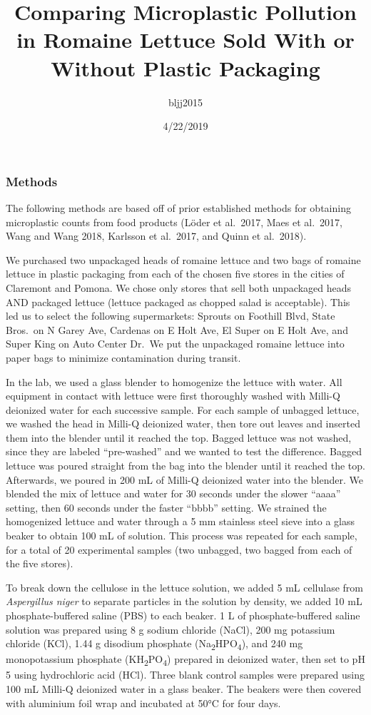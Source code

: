 \documentclass[]{article}
\title{Comparing Microplastic Pollution in Romaine Lettuce Sold With or Without
Plastic Packaging}
\author{bljj2015}
\date{4/22/2019}
\begin{document}
\maketitle

\hypertarget{methods}{%
\subsubsection{Methods}\label{methods}}

The following methods are based off of prior established methods for
obtaining microplastic counts from food products (Löder et al.~2017,
Maes et al.~2017, Wang and Wang 2018, Karlsson et al.~2017, and Quinn et
al.~2018).

We purchased two unpackaged heads of romaine lettuce and two bags of
romaine lettuce in plastic packaging from each of the chosen five stores
in the cities of Claremont and Pomona. We chose only stores that sell
both unpackaged heads AND packaged lettuce (lettuce packaged as chopped
salad is acceptable). This led us to select the following supermarkets:
Sprouts on Foothill Blvd, State Bros.~on N Garey Ave, Cardenas on E Holt
Ave, El Super on E Holt Ave, and Super King on Auto Center Dr.~We put
the unpackaged romaine lettuce into paper bags to minimize contamination
during transit.

In the lab, we used a glass blender to homogenize the lettuce with
water. All equipment in contact with lettuce were first thoroughly
washed with Milli-Q deionized water for each successive sample. For each
sample of unbagged lettuce, we washed the head in Milli-Q deionized
water, then tore out leaves and inserted them into the blender until it
reached the top. Bagged lettuce was not washed, since they are labeled
``pre-washed'' and we wanted to test the difference. Bagged lettuce was
poured straight from the bag into the blender until it reached the top.
Afterwards, we poured in 200 mL of Milli-Q deionized water into the
blender. We blended the mix of lettuce and water for 30 seconds under
the slower ``aaaa'' setting, then 60 seconds under the faster ``bbbb''
setting. We strained the homogenized lettuce and water through a 5 mm
stainless steel sieve into a glass beaker to obtain 100 mL of solution.
This process was repeated for each sample, for a total of 20
experimental samples (two unbagged, two bagged from each of the five
stores).

To break down the cellulose in the lettuce solution, we added 5 mL
cellulase from \emph{Aspergillus niger} to separate particles in the
solution by density, we added 10 mL phosphate-buffered saline (PBS) to
each beaker. 1 L of phosphate-buffered saline solution was prepared
using 8 g sodium chloride (NaCl), 200 mg potassium chloride (KCl), 1.44
g disodium phosphate (Na\textsubscript{2}HPO\textsubscript{4}), and 240
mg monopotassium phosphate (KH\textsubscript{2}PO\textsubscript{4})
prepared in deionized water, then set to pH 5 using hydrochloric acid
(HCl). Three blank control samples were prepared using 100 mL Milli-Q
deionized water in a glass beaker. The beakers were then covered with
aluminium foil wrap and incubated at 50°C for four days.
\end{document}
